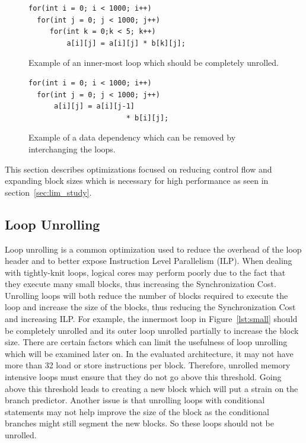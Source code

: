 \begin{figure}[t]
\begin{minipage}[t]{0.48\textwidth}
\lstset{language=C,numbersep=4pt,basicstyle=\small}
\begin{lstlisting}
for(int i = 0; i < 1000; i++)
  for(int j = 0; j < 1000; j++)
     for(int k = 0;k < 5; k++)
         a[i][j] = a[i][j] * b[k][j];
\end{lstlisting}
\vspace*{-5mm}
\caption{Example of an inner-most loop which should be completely unrolled.}
\label{lst:small}
\end{minipage}
\hfill
\begin{minipage}[t]{0.48\textwidth}
\lstset{language=C,numbersep=4pt,basicstyle=\small}
\begin{lstlisting}
for(int i = 0; i < 1000; i++)
  for(int j = 0; j < 1000; j++)
      a[i][j] = a[i][j-1] 
                       * b[i][j];
\end{lstlisting}
\vspace*{-5mm}
\caption{Example of a data dependency which can be removed by interchanging the loops.}
\label{lst:dep}
\end{minipage}
\vspace{9mm}
\end{figure}

This section describes optimizations focused on reducing control flow and expanding block sizes which is necessary for high performance as seen in section~\ref{sec:lim_study}.

\subsection{Loop Unrolling}
Loop unrolling is a common optimization used to reduce the overhead of the loop header and to better expose Instruction Level Parallelism (ILP).
When dealing with tightly-knit loops, logical cores may perform poorly due to the fact that they execute many small blocks, thus increasing the Synchronization Cost.
Unrolling loops will both reduce the number of blocks required to execute the loop and increase the size of the blocks, thus reducing the Synchronization Cost and increasing ILP.
For example, the innermost loop in Figure~\ref{lst:small} should be completely unrolled and its outer loop unrolled partially to increase the block size.
There are certain factors which can limit the usefulness of loop unrolling which will be examined later on.
In the evaluated architecture, it may not have more than 32 load or store instructions per block.
Therefore, unrolled memory intensive loops must ensure that they do not go above this threshold.
Going above this threshold leads to creating a new block which will put a strain on the branch predictor.
Another issue is that unrolling loops with conditional statements may not help improve the size of the block as the conditional branches might still segment the new blocks.
So these loops should not be unrolled.



